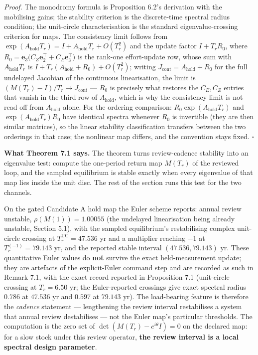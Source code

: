 \documentclass[11pt]{article}
\begin{document}
\emph{Proof.} The monodromy formula is Proposition 6.2's derivation with
the mobilising gains; the stability criterion is the discrete-time
spectral radius condition; the unit-circle characterisation is the
standard eigenvalue-crossing criterion for maps. The consistency limit
follows from
\(\exp(A_{\mathrm{hold}}T_r) = I + A_{\mathrm{hold}}T_r + O(T_r^2)\) and
the update factor \(I + T_r R_0\), where
\(R_0 = \mathbf e_3\bigl(C_Z \mathbf e_2^\top + C_E \mathbf e_3^\top\bigr)\)
is the rank-one effort-update row, whose sum with
\(A_{\mathrm{hold}}T_r\) is
\(I + T_r(A_{\mathrm{hold}} + R_0) + O(T_r^2)\); writing
\(J_{\mathrm{cont}} = A_{\mathrm{hold}} + R_0\) for the full undelayed
Jacobian of the continuous linearisation, the limit is
\((M(T_r) - I)/T_r \to J_{\mathrm{cont}}\) --- \(R_0\) is precisely what
restores the \(C_E, C_Z\) entries that vanish in the third row of
\(A_{\mathrm{hold}}\), which is why the consistency limit is not read
off from \(A_{\mathrm{hold}}\) alone. For the ordering comparison:
\(R_0 \exp(A_{\mathrm{hold}}T_r)\) and
\(\exp(A_{\mathrm{hold}}T_r) R_0\) have identical spectra whenever
\(R_0\) is invertible (they are then similar matrices), so the linear
stability classification transfers between the two orderings in that
case; the nonlinear map differs, and the convention stays fixed. \ensuremath{\square}

\textbf{What Theorem 7.1 says.} The theorem turns review-cadence
stability into an eigenvalue test: compute the one-period return map
\(M(T_r)\) of the reviewed loop, and the sampled equilibrium is stable
exactly when every eigenvalue of that map lies inside the unit disc. The
rest of the section runs this test for the two channels.

On the gated Candidate A hold map the Euler scheme reports: annual
review unstable, \(\rho(M(1)) = 1.00055\) (the undelayed linearisation
being already unstable, Section 5.1), with the sampled equilibrium's
restabilising complex unit-circle crossing at
\(T_r^{\mathrm{UC}} = 47.536\) yr and a multiplier reaching \(-1\) at
\(T_r^{(-1)} = 79.143\) yr, and the reported stable interval
\((47.536, 79.143)\) yr. These quantitative Euler values do \textbf{not}
survive the exact held-measurement update; they are artefacts of the
explicit-Euler command step and are recorded as such in Remark 7.1, with
the exact record reported in Proposition 7.1 (unit-circle crossing at
\(T_r = 6.50\) yr; the Euler-reported crossings give exact spectral
radius \(0.786\) at \(47.536\) yr and \(0.597\) at \(79.143\) yr). The
load-bearing feature is therefore the \emph{cadence} statement ---
lengthening the review interval restabilises a system that annual review
destabilises --- not the Euler map's particular thresholds. The
computation is the zero set of \(\det(M(T_r) - e^{i\theta}I) = 0\) on
the declared map: for a slow stock under this review operator,
\textbf{the review interval is a local spectral design parameter}.
\end{document}
